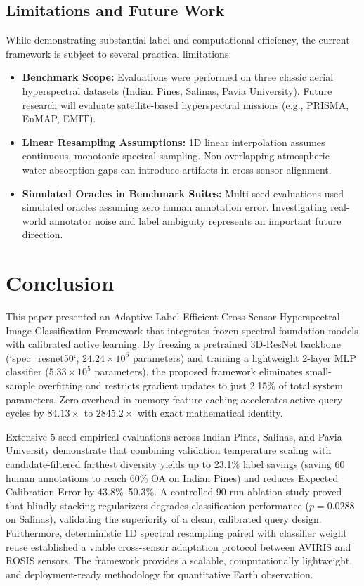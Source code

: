 \documentclass[conference,letterpaper]{IEEEtran}
\begin{document}
\subsection{Limitations and Future Work}
While demonstrating substantial label and computational efficiency, the current framework is subject to several practical limitations:
\begin{itemize}
    \item \textbf{Benchmark Scope:} Evaluations were performed on three classic aerial hyperspectral datasets (Indian Pines, Salinas, Pavia University). Future research will evaluate satellite-based hyperspectral missions (e.g., PRISMA, EnMAP, EMIT).
    \item \textbf{Linear Resampling Assumptions:} 1D linear interpolation assumes continuous, monotonic spectral sampling. Non-overlapping atmospheric water-absorption gaps can introduce artifacts in cross-sensor alignment.
    \item \textbf{Simulated Oracles in Benchmark Suites:} Multi-seed evaluations used simulated oracles assuming zero human annotation error. Investigating real-world annotator noise and label ambiguity represents an important future direction.
\end{itemize}

\section{Conclusion}

This paper presented an Adaptive Label-Efficient Cross-Sensor Hyperspectral Image Classification Framework that integrates frozen spectral foundation models with calibrated active learning. By freezing a pretrained 3D-ResNet backbone (`spec\_resnet50`, $24.24\times 10^6$ parameters) and training a lightweight 2-layer MLP classifier ($5.33\times 10^5$ parameters), the proposed framework eliminates small-sample overfitting and restricts gradient updates to just 2.15\% of total system parameters. Zero-overhead in-memory feature caching accelerates active query cycles by $84.13\times$ to $2845.2\times$ with exact mathematical identity. 

\vspace{0.3em}
Extensive 5-seed empirical evaluations across Indian Pines, Salinas, and Pavia University demonstrate that combining validation temperature scaling with candidate-filtered farthest diversity yields up to 23.1\% label savings (saving 60 human annotations to reach 60\% OA on Indian Pines) and reduces Expected Calibration Error by 43.8\%--50.3\%. A controlled 90-run ablation study proved that blindly stacking regularizers degrades classification performance ($p = 0.0288$ on Salinas), validating the superiority of a clean, calibrated query design. Furthermore, deterministic 1D spectral resampling paired with classifier weight reuse established a viable cross-sensor adaptation protocol between AVIRIS and ROSIS sensors. The framework provides a scalable, computationally lightweight, and deployment-ready methodology for quantitative Earth observation.
\end{document}
